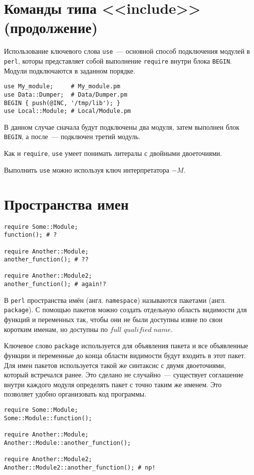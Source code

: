 \section{Команды типа <<include>> (продолжение)} %
Использование ключевого слова \verb|use|~--- основной способ подключения модулей в \verb|perl|, которы представляет собой выполнение \verb|require| внутри блока \verb|BEGIN|. Модули подключаются в заданном порядке.
\begin{verbatim}
use My_module;     # My_module.pm
use Data::Dumper;  # Data/Dumper.pm
BEGIN { push(@INC, '/tmp/lib'); }
use Local::Module; # Local/Module.pm
\end{verbatim}
В данном случае сначала будут подключены два модуля, затем выполнен блок \verb|BEGIN|, а после~--- подключен третий модуль.

Как и \verb|require|, \verb|use| умеет понимать литералы с двойными двоеточиями.

Выполнить \verb|use| можно используя ключ интерпретатора $-M$.

\section{Пространства имен} %

\begin{verbatim}
require Some::Module;
function(); # ?

require Another::Module;
another_function(); # ??

require Another::Module2;
another_function(); # again!?
\end{verbatim}

В \verb|perl| пространства имён (англ. \verb|namespace|) называются пакетами (англ. \verb|package|). С помощью пакетов можно создать отдельную область видимости для функций и переменных так, чтобы они не были доступны извне по свои коротким именам, но доступны по $full$ $qualified$ $name$.

Ключевое слово \verb|package| используется для объявления пакета и все объявленные функции и переменные до конца области видимости будут входить в этот пакет.
Для имен пакетов используется такой же синтаксис с двумя двоеточиями, который встречался ранее. Это сделано не случайно~--- существует соглашение внутри каждого модуля определять пакет с точно таким же именем. Это позволяет удобно организовать код программы.
\begin{verbatim}
require Some::Module;
Some::Module::function();

require Another::Module;
Another::Module::another_function();

require Another::Module2;
Another::Module2::another_function(); # np!
\end{verbatim}

